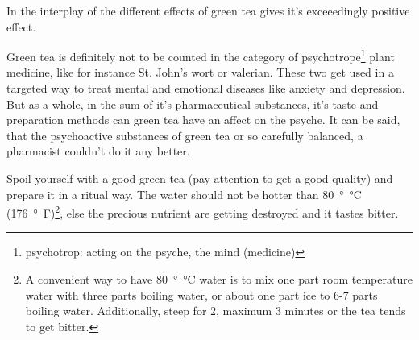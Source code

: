 \documentclass[../main.tex]{subfiles}
\begin{document}
In the interplay of the different effects of green tea gives it's exceeedingly positive effect.

Green tea is definitely not to be counted in the category of psychotrope\footnote{psychotrop: acting on the psyche, the mind (medicine)}
plant medicine, like for instance St. John's wort or valerian.
These two get used in a targeted way to treat mental and emotional diseases like anxiety and depression.
But as a whole, in the sum of it's pharmaceutical substances, it's taste and preparation methods can green tea have an affect on the psyche.
It can be said, that the psychoactive substances of green tea or so carefully balanced, a pharmacist couldn't do it any better.

Spoil yourself with a good green tea (pay attention to get a good quality) and prepare it in a ritual way.
The water should not be hotter than \SI{80}{\degree\celsius} (\SI{176}{\degree F})\footnote{A convenient way to have \SI{80}{\degree\celsius} water
is to mix one part room temperature water with three parts boiling water, or about one part ice to 6-7 parts boiling water.
Additionally, steep for 2, maximum 3 minutes or the tea tends to get bitter.},
else the precious nutrient are getting destroyed and it tastes bitter\cite{GreenTee}.
\end{document}
